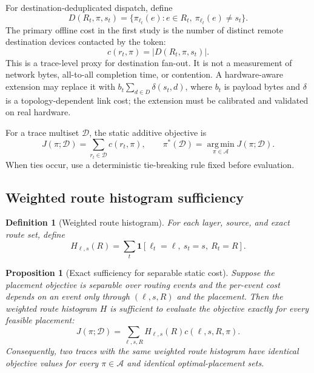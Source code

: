 \documentclass[a4paper,preprint,review,12pt,authoryear]{elsarticle}
\newtheorem{definition}{Definition}
\newtheorem{proposition}{Proposition}
\newcommand{\Dcal}{\mathcal{D}}
\newcommand{\PiSet}{\mathcal{A}}
\newcommand{\argmin}{\operatorname*{arg\,min}}
\newcommand{\card}[1]{\left|#1\right|}
\begin{document}
For destination-deduplicated dispatch, define
\begin{equation}
 D(R_t,\pi,s_t)=\{\pi_{\ell_t}(e):e\in R_t,\ \pi_{\ell_t}(e)\ne s_t\}.
\end{equation}
The primary offline cost in the first study is the number of distinct remote destination devices contacted by the token:
\begin{equation}
 c(r_t,\pi)=\card{D(R_t,\pi,s_t)}.
 \label{eq:tokencost}
\end{equation}
This is a trace-level proxy for destination fan-out. It is not a measurement of network bytes, all-to-all completion time, or contention. A hardware-aware extension may replace it with $b_t\sum_{d\in D}\delta(s_t,d)$, where $b_t$ is payload bytes and $\delta$ is a topology-dependent link cost; the extension must be calibrated and validated on real hardware.

For a trace multiset $\Dcal$, the static additive objective is
\begin{equation}
 J(\pi;\Dcal)=\sum_{r_t\in\Dcal}c(r_t,\pi),\qquad
 \pi^*(\Dcal)=\argmin_{\pi\in\PiSet}J(\pi;\Dcal).
 \label{eq:objective}
\end{equation}
When ties occur, use a deterministic tie-breaking rule fixed before evaluation.

\subsection{Weighted route histogram sufficiency}

\begin{definition}[Weighted route histogram]
For each layer, source, and exact route set, define
\begin{equation}
 H_{\ell,s}(R)=\sum_{t}\mathbf{1}[\ell_t=\ell,\ s_t=s,\ R_t=R].
 \label{eq:hist}
\end{equation}
\end{definition}

\begin{proposition}[Exact sufficiency for separable static cost]
\label{prop:suff}
Suppose the placement objective is separable over routing events and the per-event cost depends on an event only through $(\ell,s,R)$ and the placement. Then the weighted route histogram $H$ is sufficient to evaluate the objective exactly for every feasible placement:
\begin{equation}
 J(\pi;\Dcal)=\sum_{\ell,s,R}H_{\ell,s}(R)c(\ell,s,R,\pi).
 \label{eq:suff}
\end{equation}
Consequently, two traces with the same weighted route histogram have identical objective values for every $\pi\in\PiSet$ and identical optimal-placement sets.
\end{proposition}
\end{document}

